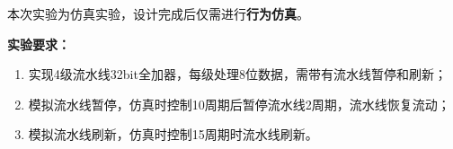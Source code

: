 本次实验为仿真实验，设计完成后仅需进行\textbf{行为仿真}。

\textbf{实验要求：}



\begin{enumerate}
    \item 实现4级流水线32bit全加器，每级处理8位数据，需带有流水线暂停和刷新；
    \item 模拟流水线暂停，仿真时控制10周期后暂停流水线2周期，流水线恢复流动；
    \item 模拟流水线刷新，仿真时控制15周期时流水线刷新。

\end{enumerate}